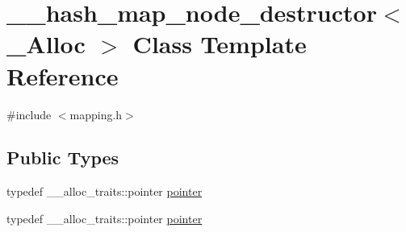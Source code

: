 \hypertarget{class____hash__map__node__destructor}{}\section{\+\_\+\+\_\+hash\+\_\+map\+\_\+node\+\_\+destructor$<$ \+\_\+\+Alloc $>$ Class Template Reference}
\label{class____hash__map__node__destructor}


{\ttfamily \#include $<$mapping.\+h$>$}

\subsection*{Public Types}
\begin{DoxyCompactItemize}
\item 
typedef \+\_\+\+\_\+alloc\+\_\+traits\+::pointer \hyperlink{class____hash__map__node__destructor_a17f355285c7ac0618f1acb9b8a886890}{pointer}
\item 
typedef \+\_\+\+\_\+alloc\+\_\+traits\+::pointer \hyperlink{class____hash__map__node__destructor_a17f355285c7ac0618f1acb9b8a886890}{pointer}
\end{DoxyCompactItemize}
